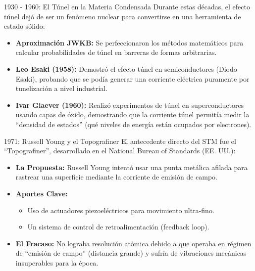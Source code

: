 \begin{frame}{1930 - 1960: El Túnel en la Materia Condensada}
  Durante estas décadas, el efecto túnel dejó de ser un fenómeno nuclear para
  convertirse en una herramienta de estado sólido:
  \begin{itemize}
    \item \textbf{Aproximación JWKB:} Se perfeccionaron los métodos matemáticos
      para calcular probabilidades de túnel en barreras de formas arbitrarias.
    \item \textbf{Leo Esaki (1958):} Demostró el efecto túnel en semiconductores
      (Diodo Esaki), probando que se podía generar una corriente eléctrica
      puramente por tunelización a nivel industrial.
    \item \textbf{Ivar Giaever (1960):} Realizó experimentos de túnel en
      superconductores usando capas de óxido, demostrando que la corriente túnel
      permitía medir la ``densidad de estados'' (qué niveles de energía están
      ocupados por electrones).
  \end{itemize}
\end{frame}

\begin{frame}{1971: Russell Young y el Topografiner}
  El antecedente directo del STM fue el ``Topografiner'', desarrollado en el
  National Bureau of Standards (EE. UU.):
  \begin{itemize}
    \item \textbf{La Propuesta:} Russell Young intentó usar una punta metálica
      afilada para rastrear una superficie mediante la corriente de emisión de
      campo.
    \item \textbf{Aportes Clave:}
      \begin{itemize}
        \item Uso de actuadores piezoeléctricos para movimiento ultra-fino.
        \item Un sistema de control de retroalimentación (feedback loop).
      \end{itemize}
    \item \textbf{El Fracaso:} No lograba resolución atómica debido a que
      operaba en régimen de ``emisión de campo'' (distancia grande) y sufría de
      vibraciones mecánicas insuperables para la época.
  \end{itemize}
\end{frame}

